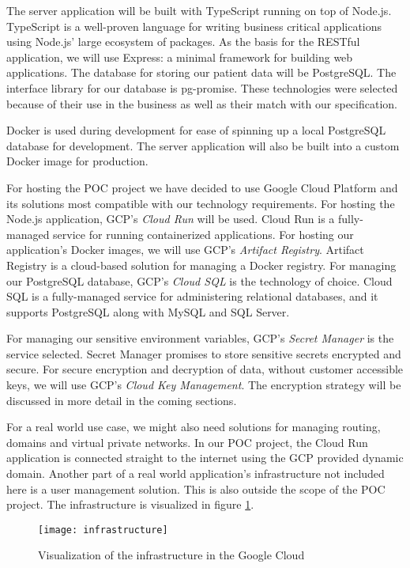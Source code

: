 The server application will be built with TypeScript running on top of Node.js.
TypeScript is a well-proven language for writing business critical applications using Node.js' large ecosystem of packages.
As the basis for the RESTful application, we will use Express: a minimal framework for building web applications.
The database for storing our patient data will be PostgreSQL.
The interface library for our database is pg-promise.
These technologies were selected because of their use in the business as well as their match with our specification.

Docker is used during development for ease of spinning up a local PostgreSQL database for development.
The server application will also be built into a custom Docker image for production.

For hosting the POC project we have decided to use Google Cloud Platform and its solutions most compatible with our technology requirements.
For hosting the Node.js application, GCP's \textit{Cloud Run} will be used.
Cloud Run is a fully-managed service for running containerized applications.
For hosting our application's Docker images, we will use GCP's \textit{Artifact Registry}.
Artifact Registry is a cloud-based solution for managing a Docker registry.
For managing our PostgreSQL database, GCP's \textit{Cloud SQL} is the technology of choice.
Cloud SQL is a fully-managed service for administering relational databases, and it supports PostgreSQL along with MySQL and SQL Server.

For managing our sensitive environment variables, GCP's \textit{Secret Manager} is the service selected.
Secret Manager promises to store sensitive secrets encrypted and secure.
For secure encryption and decryption of data, without customer accessible keys, we will use GCP's \textit{Cloud Key Management}.
The encryption strategy will be discussed in more detail in the coming sections.

For a real world use case, we might also need solutions for managing routing, domains and virtual private networks.
In our POC project, the Cloud Run application is connected straight to the internet using the GCP provided dynamic domain.
Another part of a real world application's infrastructure not included here is a user management solution.
This is also outside the scope of the POC project.
The infrastructure is visualized in figure \ref{fig:infrastructure}.

\begin{figure}[!htb]
\centering
\texttt{[image: infrastructure]}
\caption{Visualization of the infrastructure in the Google Cloud}
\label{fig:infrastructure}
\end{figure}

